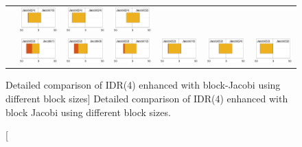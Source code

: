 \begin{landscape}
\begin{figure}[p]
\begin{tabular}{c|cccccc}
&
\includegraphics[width=.135\columnwidth]{plots/Jacobi(24)_vs_Jacobi(16).pdf}
&
\includegraphics[width=.135\columnwidth]{plots/Jacobi(24)_vs_Jacobi(24).pdf}
&
\includegraphics[width=.135\columnwidth]{plots/Jacobi(24)_vs_Jacobi(32).pdf}
\\
\parbox[c]{5pt}{}
&
\includegraphics[width=.135\columnwidth]{plots/Jacobi(32)_vs_Jacobi(1).pdf}
&
\includegraphics[width=.135\columnwidth]{plots/Jacobi(32)_vs_Jacobi(8).pdf}
&
\includegraphics[width=.135\columnwidth]{plots/Jacobi(32)_vs_Jacobi(12).pdf}
&
\includegraphics[width=.135\columnwidth]{plots/Jacobi(32)_vs_Jacobi(16).pdf}
&
\includegraphics[width=.135\columnwidth]{plots/Jacobi(32)_vs_Jacobi(24).pdf}
&
 \includegraphics[width=.135\columnwidth]{plots/Jacobi(32)_vs_Jacobi(32).pdf}
\\
\end{tabular}
\caption
[Detailed comparison of IDR(4) enhanced with block-Jacobi
using different block sizes]
{
Detailed comparison of IDR(4) enhanced with block Jacobi
using different block sizes.
}
\label{2017-gje-block-jacobi:fig:solverperformance-detailed}
\end{figure}
\end{landscape}


